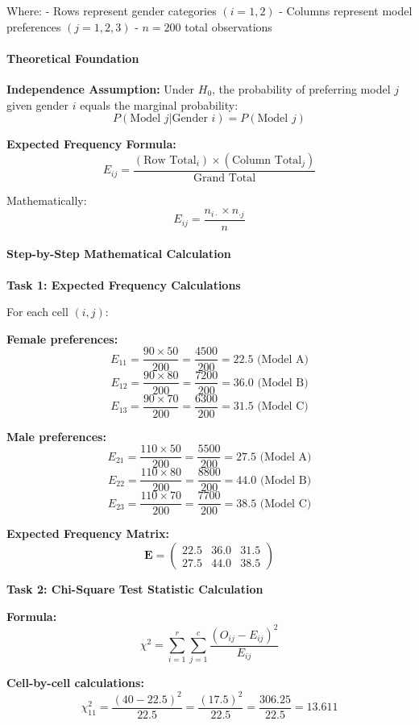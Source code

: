 \documentclass[11pt]{article}
\begin{document}
Where: - Rows represent gender categories \((i = 1, 2)\) - Columns
represent model preferences \((j = 1, 2, 3)\) - \(n = 200\) total
observations

\paragraph{Theoretical Foundation}\label{theoretical-foundation}

\textbf{Independence Assumption:} Under \(H_0\), the probability of
preferring model \(j\) given gender \(i\) equals the marginal
probability:
\[P(\text{Model } j | \text{Gender } i) = P(\text{Model } j)\]

\textbf{Expected Frequency Formula:}
\[E_{ij} = \frac{(\text{Row Total}_i) \times (\text{Column Total}_j)}{\text{Grand Total}}\]

Mathematically: \[E_{ij} = \frac{n_{i \cdot} \times n_{\cdot j}}{n}\]

\paragraph{Step-by-Step Mathematical
Calculation}\label{step-by-step-mathematical-calculation}

\textbf{Task 1: Expected Frequency Calculations}

For each cell \((i,j)\):

\textbf{Female preferences:}
\[E_{11} = \frac{90 \times 50}{200} = \frac{4500}{200} = 22.5 \text{ (Model A)}\]
\[E_{12} = \frac{90 \times 80}{200} = \frac{7200}{200} = 36.0 \text{ (Model B)}\]
\[E_{13} = \frac{90 \times 70}{200} = \frac{6300}{200} = 31.5 \text{ (Model C)}\]

\textbf{Male preferences:}
\[E_{21} = \frac{110 \times 50}{200} = \frac{5500}{200} = 27.5 \text{ (Model A)}\]
\[E_{22} = \frac{110 \times 80}{200} = \frac{8800}{200} = 44.0 \text{ (Model B)}\]
\[E_{23} = \frac{110 \times 70}{200} = \frac{7700}{200} = 38.5 \text{ (Model C)}\]

\textbf{Expected Frequency Matrix:} \[\mathbf{E} = \begin{pmatrix}
22.5 & 36.0 & 31.5 \\
27.5 & 44.0 & 38.5
\end{pmatrix}\]

\textbf{Task 2: Chi-Square Test Statistic Calculation}

\textbf{Formula:}
\[\chi^2 = \sum_{i=1}^{r} \sum_{j=1}^{c} \frac{(O_{ij} - E_{ij})^2}{E_{ij}}\]

\textbf{Cell-by-cell calculations:}
\[\chi^2_{11} = \frac{(40 - 22.5)^2}{22.5} = \frac{(17.5)^2}{22.5} = \frac{306.25}{22.5} = 13.611\]
\end{document}
